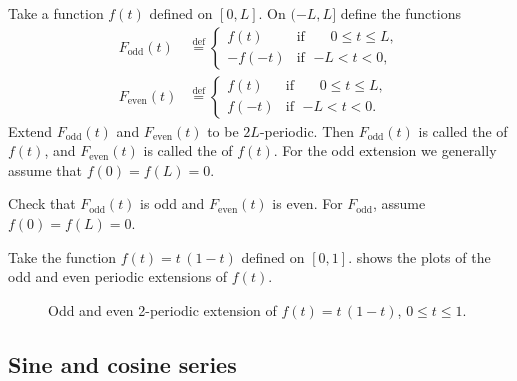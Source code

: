 \documentclass[12pt]{book}
\begin{document}
Take a function $f(t)$ defined on $[0,L]$.  On $(-L,L]$ define the functions
\begin{align*}
F_{\text{odd}}(t) & \overset{\text{def}}{=}
\begin{cases}
f(t) & \text{if } \; \phantom{-}0 \leq t \leq L , \\
-f(-t) & \text{if } \; {-L} < t < 0 ,
\end{cases}
\\
F_{\text{even}}(t) & \overset{\text{def}}{=}
\begin{cases}
f(t) & \text{if } \; \phantom{-}0 \leq t \leq L , \\
f(-t) & \text{if } \; {-L} < t < 0 .
\end{cases}
\end{align*}
Extend $F_{\text{odd}}(t)$ and $F_{\text{even}}(t)$ to be $2L$-periodic.
Then
$F_{\text{odd}}(t)$ is called
the \emph{} of $f(t)$, and
$F_{\text{even}}(t)$ is called the
\emph{} of $f(t)$.
For the odd extension we generally assume that $f(0) = f(L) = 0$.

\begin{exercise}
Check that $F_{\text{odd}}(t)$ is odd and $F_{\text{even}}(t)$ is even.
For $F_{\text{odd}}$,
assume $f(0) = f(L) = 0$.
\end{exercise}

\begin{example}
Take the function $f(t) = t\,(1-t)$ defined on $[0,1]$. 
shows the plots of the odd and even periodic extensions of $f(t)$.

\begin{figure}[h!t]
\capstart
\begin{center}
\quad
{}
\caption{Odd and even 2-periodic extension of $f(t) =
t\,(1-t)$, $0 \leq t \leq 1$.\label{scs:oddevenextfig}}
\end{center}
\end{figure}
\end{example}

\subsection{Sine and cosine series}
\end{document}
